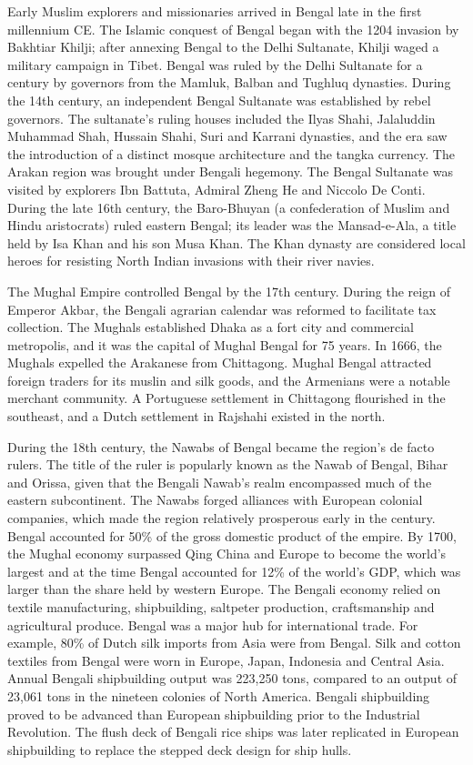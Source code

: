Early Muslim explorers and missionaries arrived in Bengal late in the
first millennium CE. The Islamic conquest of Bengal began with the 1204
invasion by Bakhtiar Khilji; after annexing Bengal to the Delhi
Sultanate, Khilji waged a military campaign in Tibet. Bengal was ruled
by the Delhi Sultanate for a century by governors from the Mamluk,
Balban and Tughluq dynasties. During the 14th century, an independent
Bengal Sultanate was established by rebel governors. The sultanate's
ruling houses included the Ilyas Shahi, Jalaluddin Muhammad Shah,
Hussain Shahi, Suri and Karrani dynasties, and the era saw the
introduction of a distinct mosque architecture and the tangka currency.
The Arakan region was brought under Bengali hegemony. The Bengal
Sultanate was visited by explorers Ibn Battuta, Admiral Zheng He and
Niccolo De Conti. During the late 16th century, the Baro-Bhuyan (a
confederation of Muslim and Hindu aristocrats) ruled eastern Bengal; its
leader was the Mansad-e-Ala, a title held by Isa Khan and his son Musa
Khan. The Khan dynasty are considered local heroes for resisting North
Indian invasions with their river navies.

The Mughal Empire controlled Bengal by the 17th century. During the
reign of Emperor Akbar, the Bengali agrarian calendar was reformed to
facilitate tax collection. The Mughals established Dhaka as a fort city
and commercial metropolis, and it was the capital of Mughal Bengal for
75 years. In 1666, the Mughals expelled the Arakanese from Chittagong.
Mughal Bengal attracted foreign traders for its muslin and silk goods,
and the Armenians were a notable merchant community. A Portuguese
settlement in Chittagong flourished in the southeast, and a Dutch
settlement in Rajshahi existed in the north.

During the 18th century, the Nawabs of Bengal became the region's de
facto rulers. The title of the ruler is popularly known as the Nawab of
Bengal, Bihar and Orissa, given that the Bengali Nawab's realm
encompassed much of the eastern subcontinent. The Nawabs forged
alliances with European colonial companies, which made the region
relatively prosperous early in the century. Bengal accounted for 50\% of
the gross domestic product of the empire. By 1700, the Mughal economy
surpassed Qing China and Europe to become the world's largest and at the
time Bengal accounted for 12\% of the world's GDP, which was larger than
the share held by western Europe. The Bengali economy relied on textile
manufacturing, shipbuilding, saltpeter production, craftsmanship and
agricultural produce. Bengal was a major hub for international trade.
For example, 80\% of Dutch silk imports from Asia were from Bengal. Silk
and cotton textiles from Bengal were worn in Europe, Japan, Indonesia
and Central Asia. Annual Bengali shipbuilding output was 223,250 tons,
compared to an output of 23,061 tons in the nineteen colonies of North
America. Bengali shipbuilding proved to be advanced than European
shipbuilding prior to the Industrial Revolution. The flush deck of
Bengali rice ships was later replicated in European shipbuilding to
replace the stepped deck design for ship hulls.

